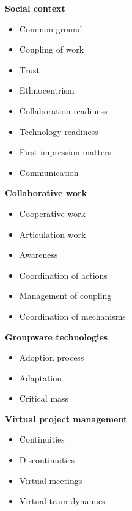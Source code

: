 \textbf{Social context}
\begin{itemize}
  \item Common ground
  \item Coupling of work
  \item Trust
	\item Ethnocentrism
	\item Collaboration readiness
	\item Technology readiness
	\item First impression matters
	\item Communication
\end{itemize}
\textbf{Collaborative work}
\begin{itemize}
  \item Cooperative work
  \item Articulation work
  \item Awareness
	\item Coordination of actions
	\item Management of coupling
	\item Coordination of mechanisms
\end{itemize}
\textbf{Groupware technologies}
\begin{itemize}
  \item Adoption process
  \item Adaptation
  \item Critical mass
\end{itemize}
\textbf{Virtual project management}
\begin{itemize}
  \item Continuities
  \item Discontinuities
  \item Virtual meetings
	\item Virtual team dynamics
\end{itemize}